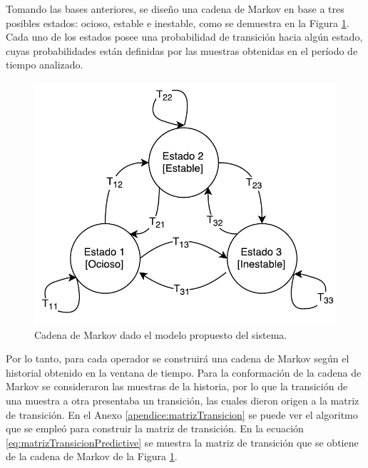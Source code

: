 Tomando las bases anteriores, se diseño una cadena de Markov en base a tres posibles estados: ocioso, estable e inestable, como se demuestra en la Figura \ref{fig:cadenaMarkovPredictiva}. Cada uno de los estados posee una probabilidad de transición hacia algún estado, cuyas probabilidades están definidas por las muestras obtenidas en el período de tiempo analizado.

\begin{figure}[ht!]
  \centering
    \includegraphics[scale=0.75]{images/CadenaMarkovPredictiva.pdf}
  \caption{Cadena de Markov dado el modelo propuesto del sistema.}
  \label{fig:cadenaMarkovPredictiva}
\end{figure}


Por lo tanto, para cada operador se construirá una cadena de Markov según el historial obtenido en la ventana de tiempo. Para la conformación de la cadena de Markov se consideraron las muestras de la historia, por lo que la transición de una muestra a otra presentaba un transición, las cuales dieron origen a la matriz de transición. En el Anexo \ref{apendice:matrizTransicion} se puede ver el algoritmo que se empleó para construir la matriz de transición. En la ecuación \ref{eq:matrizTransicionPredictive} se muestra la matriz de transición que se obtiene de la cadena de Markov de la Figura \ref{fig:cadenaMarkovPredictiva}.

